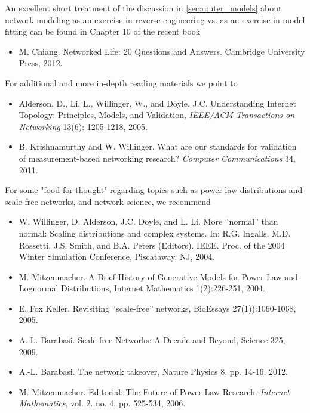 An excellent short treatment of the discussion in \autoref{sec:router_models} about network modeling
as an exercise in reverse-engineering vs. as an exercise in model fitting can be 
found in Chapter 10 of the recent book

\begin{itemize}

\item[\cite{chiang12:_networ_life}] M. Chiang.
Networked Life: 20 Questions and Answers.
Cambridge University Press, 2012.

\end{itemize}

For additional and more in-depth reading materials we  point to 

\begin{itemize}

\item[\cite{Alderson05}] Alderson, D., Li, L., Willinger, W., and Doyle, J.C. 
Understanding Internet Topology: Principles, Models, and Validation, 
{\em IEEE/ACM Transactions on Networking} 13(6): 1205-1218, 2005.

\item[\cite{krishnamurthy11:_what}] B. Krishnamurthy and W. Willinger. 
What are our standards for validation of measurement-based networking research? 
{\em Computer Communications} 34, 2011.

\end{itemize}

For some "food for thought" regarding topics such as power law distributions and 
scale-free networks, and network science, we recommend 
\begin{itemize}

\item[\cite{Willinger04}] W. Willinger, D. Alderson, J.C. Doyle, and L. Li. 
More ``normal'' than normal: Scaling distributions and complex systems. 
In: R.G. Ingalls, M.D. Rossetti, J.S. Smith, and B.A. Peters (Editors).
IEEE. Proc. of the 2004 Winter Simulation Conference, Piscataway, NJ, 2004.

\item[\cite{Mitzenmacher01}] M. Mitzenmacher.
A Brief History of Generative Models for Power Law and Lognormal Distributions,
Internet Mathematics 1(2):226-251, 2004.

\item[\cite{keller05:_revis}] E. Fox Keller.
Revisiting ``scale-free'' networks,
BioEssays 27(1)):1060-1068, 2005.

\item[\cite{barabasi09:_scale_free_networ}] A.-L. Barabasi.
Scale-free Networks: A Decade and Beyond,
Science 325, 2009.

\item[\cite{barabasi12}] A.-L. Barabasi.
The network takeover,
Nature Physics 8, pp. 14-16, 2012.
  
\item[\cite{mitzenmacher06:_editor}] 
	M. Mitzenmacher.
	Editorial: The Future of Power Law Research.
	{\em Internet Mathematics}, vol. 2. no. 4, pp. 525-534, 2006. 

\end{itemize}



